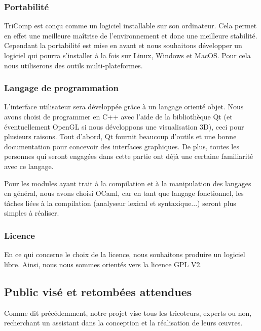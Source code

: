 \documentclass{article}
\begin{document}
\subsubsection{Portabilité}

TriComp est conçu comme un logiciel installable sur son ordinateur. Cela permet en effet une meilleure maîtrise de l'environnement et donc
une meilleure stabilité. Cependant la portabilité est mise en avant et nous souhaitons développer un logiciel qui pourra s'installer à la
fois sur Linux, Windows et MacOS. Pour cela nous utiliserons des outils multi-plateformes.

\subsubsection{Langage de programmation}

L'interface utilisateur sera développée grâce à un langage orienté objet. Nous avons choisi de programmer en C++ avec l'aide de la
bibliothèque Qt (et éventuellement OpenGL si nous développons une visualisation 3D), ceci pour plusieurs raisons. Tout d'abord, Qt fournit
beaucoup d'outils et une bonne documentation pour concevoir des interfaces graphiques. De plus, toutes les personnes qui seront engagées
dans cette partie ont déjà une certaine familiarité avec ce langage.

Pour les modules ayant trait à la compilation et à la manipulation des langages en général, nous avons choisi OCaml, car en
tant que langage fonctionnel, les tâches liées à la compilation (analyseur
lexical et syntaxique...) seront plus simples à réaliser.


\subsubsection{Licence}

En ce qui concerne le choix de la licence, nous souhaitons produire un logiciel libre. Ainsi, nous nous sommes orientés vers la licence
GPL V2. %

\subsection{Public visé et retombées attendues}

Comme dit précédemment, notre projet vise tous les tricoteurs, experts ou non, recherchant un assistant dans la conception et la
réalisation de leurs \oe{}uvres.
\end{document}
